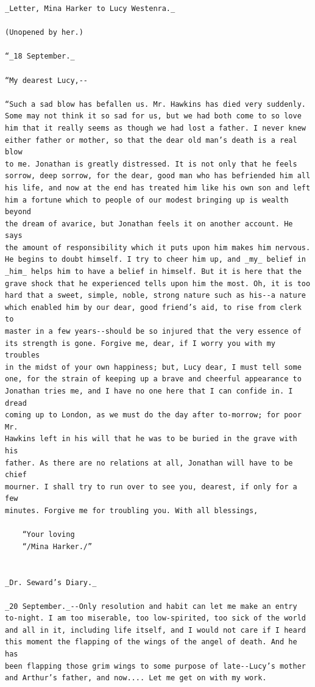 \documentclass{article}
\begin{document}
\begin{verbatim}
_Letter, Mina Harker to Lucy Westenra._

(Unopened by her.)

“_18 September._

“My dearest Lucy,--

“Such a sad blow has befallen us. Mr. Hawkins has died very suddenly.
Some may not think it so sad for us, but we had both come to so love
him that it really seems as though we had lost a father. I never knew
either father or mother, so that the dear old man’s death is a real blow
to me. Jonathan is greatly distressed. It is not only that he feels
sorrow, deep sorrow, for the dear, good man who has befriended him all
his life, and now at the end has treated him like his own son and left
him a fortune which to people of our modest bringing up is wealth beyond
the dream of avarice, but Jonathan feels it on another account. He says
the amount of responsibility which it puts upon him makes him nervous.
He begins to doubt himself. I try to cheer him up, and _my_ belief in
_him_ helps him to have a belief in himself. But it is here that the
grave shock that he experienced tells upon him the most. Oh, it is too
hard that a sweet, simple, noble, strong nature such as his--a nature
which enabled him by our dear, good friend’s aid, to rise from clerk to
master in a few years--should be so injured that the very essence of
its strength is gone. Forgive me, dear, if I worry you with my troubles
in the midst of your own happiness; but, Lucy dear, I must tell some
one, for the strain of keeping up a brave and cheerful appearance to
Jonathan tries me, and I have no one here that I can confide in. I dread
coming up to London, as we must do the day after to-morrow; for poor Mr.
Hawkins left in his will that he was to be buried in the grave with his
father. As there are no relations at all, Jonathan will have to be chief
mourner. I shall try to run over to see you, dearest, if only for a few
minutes. Forgive me for troubling you. With all blessings,

    “Your loving
    “/Mina Harker./”


_Dr. Seward’s Diary._

_20 September._--Only resolution and habit can let me make an entry
to-night. I am too miserable, too low-spirited, too sick of the world
and all in it, including life itself, and I would not care if I heard
this moment the flapping of the wings of the angel of death. And he has
been flapping those grim wings to some purpose of late--Lucy’s mother
and Arthur’s father, and now.... Let me get on with my work.


\end{verbatim}
\end{document}
